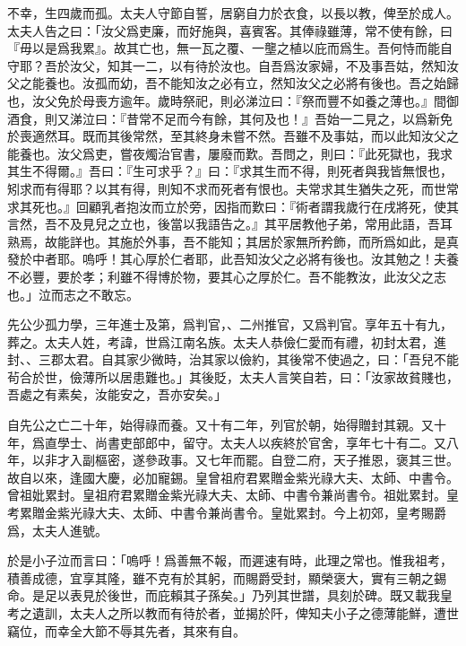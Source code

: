 不幸，生四歲而孤。太夫人守節自誓，居窮自力於衣食，以長以教，俾至於成人。太夫人告之曰：「汝父爲吏廉，而好施與，喜賓客。其俸祿雖薄，常不使有餘，曰『毋以是爲我累』。故其亡也，無一瓦之覆、一壟之植以庇而爲生。吾何恃而能自守耶？吾於汝父，知其一二，以有待於汝也。自吾爲汝家婦，不及事吾姑，然知汝父之能養也。汝孤而幼，吾不能知汝之必有立，然知汝父之必將有後也。吾之始歸也，汝父免於母喪方逾年。歲時祭祀，則必涕泣曰：『祭而豐不如養之薄也。』間御酒食，則又涕泣曰：『昔常不足而今有餘，其何及也！』吾始一二見之，以爲新免於喪適然耳。既而其後常然，至其終身未嘗不然。吾雖不及事姑，而以此知汝父之能養也。汝父爲吏，嘗夜燭治官書，屢廢而歎。吾問之，則曰：『此死獄也，我求其生不得爾。』吾曰：『生可求乎？』曰：『求其生而不得，則死者與我皆無恨也，矧求而有得耶？以其有得，則知不求而死者有恨也。夫常求其生猶失之死，而世常求其死也。』回顧乳者抱汝而立於旁，因指而歎曰：『術者謂我歲行在戌將死，使其言然，吾不及見兒之立也，後當以我語告之。』其平居教他子弟，常用此語，吾耳熟焉，故能詳也。其施於外事，吾不能知；其居於家無所矜飾，而所爲如此，是真發於中者耶。嗚呼！其心厚於仁者耶，此吾知汝父之必將有後也。汝其勉之！夫養不必豐，要於孝；利雖不得博於物，要其心之厚於仁。吾不能教汝，此汝父之志也。」泣而志之不敢忘。

先公少孤力學，三年進士及第，爲判官，、二州推官，又爲判官。享年五十有九，葬之。太夫人姓，考諱，世爲江南名族。太夫人恭儉仁愛而有禮，初封太君，進封、、三郡太君。自其家少微時，治其家以儉約，其後常不使過之，曰：「吾兒不能茍合於世，儉薄所以居患難也。」其後貶，太夫人言笑自若，曰：「汝家故貧賤也，吾處之有素矣，汝能安之，吾亦安矣。」

自先公之亡二十年，始得祿而養。又十有二年，列官於朝，始得贈封其親。又十年，爲直學士、尚書吏部郎中，留守。太夫人以疾終於官舍，享年七十有二。又八年，以非才入副樞密，遂參政事。又七年而罷。自登二府，天子推恩，褒其三世。故自以來，逢國大慶，必加寵錫。皇曾祖府君累贈金紫光祿大夫、太師、中書令。曾祖妣累封。皇祖府君累贈金紫光祿大夫、太師、中書令兼尚書令。祖妣累封。皇考累贈金紫光祿大夫、太師、中書令兼尚書令。皇妣累封。今上初郊，皇考賜爵爲，太夫人進號。

於是小子泣而言曰：「嗚呼！爲善無不報，而遲速有時，此理之常也。惟我祖考，積善成德，宜享其隆，雖不克有於其躬，而賜爵受封，顯榮褒大，實有三朝之錫命。是足以表見於後世，而庇賴其子孫矣。」乃列其世譜，具刻於碑。既又載我皇考之遺訓，太夫人之所以教而有待於者，並揭於阡，俾知夫小子之德薄能鮮，遭世竊位，而幸全大節不辱其先者，其來有自。


